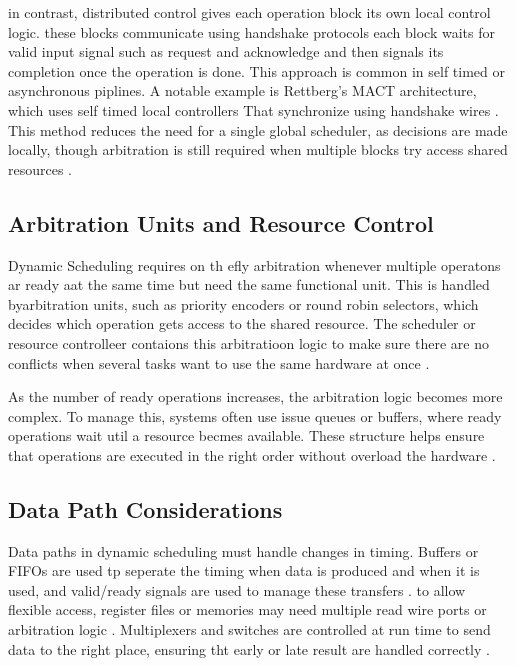 \documentclass[conference]{IEEEtran}
\begin{document}
in contrast, distributed control gives each operation block its own local control logic. these blocks communicate using handshake protocols each block waits for valid input signal such as request and acknowledge and then signals its completion once the operation is done. This approach is common in self timed or asynchronous piplines. A notable example is Rettberg's MACT architecture, which uses self timed local controllers That synchronize using handshake wires \cite{Rettberg2006}. This method reduces the need for a single global scheduler, as decisions are made locally, though arbitration is still required when multiple blocks try access shared resources \cite{Rettberg2006}.

\subsection{Arbitration Units and Resource Control}
Dynamic Scheduling requires on th efly arbitration whenever multiple operatons ar ready aat the same time but need the same functional unit. This is handled byarbitration units, such as priority encoders or round robin selectors, which decides which operation gets access to the shared resource. The scheduler or resource controlleer contaions this arbitratioon logic to make sure there are no conflicts when several tasks want to use the same hardware at once \cite{DeMicheli1994, Rettberg2006}.

As the number of ready operations increases, the arbitration logic becomes more complex. To manage this, systems often use issue queues or buffers, where ready operations wait util a resource becmes available. These structure helps ensure that operations are executed in the right order without overload the hardware \cite{DeMicheli1994}.

\subsection{Data Path Considerations}
Data paths in dynamic scheduling must handle changes in timing. Buffers or FIFOs are used tp seperate the timing when data is produced and when it is used, and valid/ready signals are used to manage these transfers \cite{DeMicheli1994,Rettberg2006}. to allow flexible access, register files or memories may need multiple read wire ports or arbitration logic \cite{DeMicheli1994, Scheffer2016}.
Multiplexers and switches are controlled at run time to send data to the right place, ensuring tht early or late result are handled correctly \cite{Ha2017, DeMicheli1994}.
\end{document}

